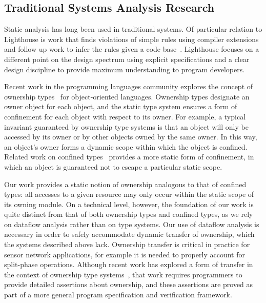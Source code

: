 \subsection{Traditional Systems Analysis Research}



Static analysis has long been used in traditional systems.
%
Of particular relation to Lighthouse is work that finds violations of simple
rules using compiler extensions~\cite{engler00checking} and follow up work
to infer the rules given a code base~\cite{kremenek06from}.
%
Lighthouse focuses on a different point on the design spectrum using explicit
specifications and a clear design discipline to provide maximum
understanding to program developers.



Recent work in the programming languages community explores the concept of
ownership types~\cite{ownership,ownership2,BoyapatiEtAl02,aliasjava} for
object-oriented languages. 
%
Ownership types designate an owner object for each object, and the static
type system ensures a form of confinement for each object with respect to
its owner.  
%
For example, a typical invariant guaranteed by ownership type systems is
that an object will only be accessed by its owner or by other objects owned
by the same owner.  
%
In this way, an object's owner forms a dynamic scope within which the object
is confined.  
%
Related work on confined types~\cite{confined1,confined2} provides a more
static form of confinement, in which an object is guaranteed not to escape a
particular static scope.



Our work provides a static notion of ownership analogous to that of confined
types:  all accesses to a given resource may only occur within the static
scope of its owning module.  
%
On a technical level, however, the foundation of our work is quite distinct
from that of both ownership types and confined types, as we rely on dataflow
analysis rather than on type systems.  
%
Our use of dataflow analysis is necessary in order to safely accommodate
dynamic transfer of ownership, which the systems described above lack.  
%
Ownership transfer is critical in practice for sensor network applications,
for example it is needed to properly account for split-phase operations.  
%
Although recent work has explored a form of transfer in the context of
ownership type systems~\cite{DBLP:conf/ecoop/BanerjeeN05}, that work
requires programmers to provide detailed assertions about ownership, and
these assertions are proved as part of a more general program specification
and verification framework.



